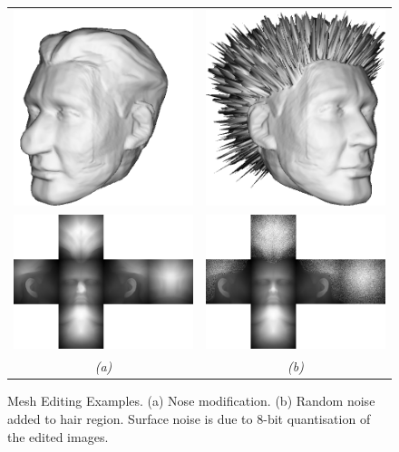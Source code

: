 \begin{figure}
\begin{center}
\begin{tabular}{cc}
\includegraphics[width=6cm]{../images/editing_nose} &
\includegraphics[width=6cm]{../images/editing_hair} \\
\includegraphics[width=6cm]{../images/editing_nose_map} &
\includegraphics[width=6cm]{../images/editing_hair_map} \\
{\it (a)} & {\it (b)}
\end{tabular}
\caption[Mesh Editing Examples]{\label{fig:meshediting} Mesh Editing Examples. (a) Nose modification. (b) Random noise added to hair region. Surface noise is due to 8-bit quantisation of the edited images.}
\end{center}
\end{figure}

